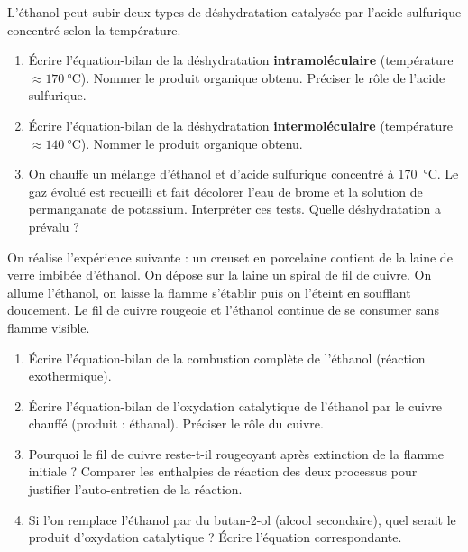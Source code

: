 \documentclass[11pt]{article}
\begin{document}
\begin{exercice}
L'éthanol peut subir deux types de déshydratation catalysée par l'acide sulfurique concentré selon la température.
\begin{enumerate}
    \item Écrire l'équation-bilan de la déshydratation \textbf{intramoléculaire} (température $\approx \SI{170}{\celsius}$). Nommer le produit organique obtenu. Préciser le rôle de l'acide sulfurique.
    \item Écrire l'équation-bilan de la déshydratation \textbf{intermoléculaire} (température $\approx \SI{140}{\celsius}$). Nommer le produit organique obtenu.
    \item On chauffe un mélange d'éthanol et d'acide sulfurique concentré à \SI{170}{\celsius}. Le gaz évolué est recueilli et fait décolorer l'eau de brome et la solution de permanganate de potassium. Interpréter ces tests. Quelle déshydratation a prévalu ?
\end{enumerate}
\end{exercice}

\begin{exercice}
On réalise l'expérience suivante : un creuset en porcelaine contient de la laine de verre imbibée d'éthanol. On dépose sur la laine un spiral de fil de cuivre. On allume l'éthanol, on laisse la flamme s'établir puis on l'éteint en soufflant doucement. Le fil de cuivre rougeoie et l'éthanol continue de se consumer sans flamme visible.
\begin{enumerate}
    \item Écrire l'équation-bilan de la combustion complète de l'éthanol (réaction exothermique).
    \item Écrire l'équation-bilan de l'oxydation catalytique de l'éthanol par le cuivre chauffé (produit : éthanal). Préciser le rôle du cuivre.
    \item Pourquoi le fil de cuivre reste-t-il rougeoyant après extinction de la flamme initiale ? Comparer les enthalpies de réaction des deux processus pour justifier l'auto-entretien de la réaction.
    \item Si l'on remplace l'éthanol par du butan-2-ol (alcool secondaire), quel serait le produit d'oxydation catalytique ? Écrire l'équation correspondante.
\end{enumerate}
\end{exercice}
\end{document}
